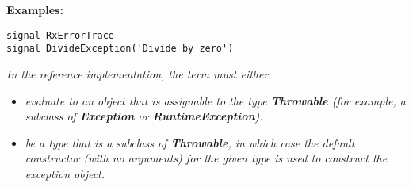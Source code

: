 \textbf{Examples:}
\begin{lstlisting}
signal RxErrorTrace
signal DivideException('Divide by zero')
\end{lstlisting}

\emph{In the reference implementation, the \emph{term} must
either}
\begin{itemize}
\item 
\emph{evaluate to an object that is assignable to the
type \textbf{Throwable} (for example, a subclass
of \textbf{Exception} or \textbf{RuntimeException}).}
\item 
\emph{be a type that is a subclass of \textbf{Throwable}, in which case
the default constructor (with no arguments) for the given type is used
to construct the exception object.}
\end{itemize}
